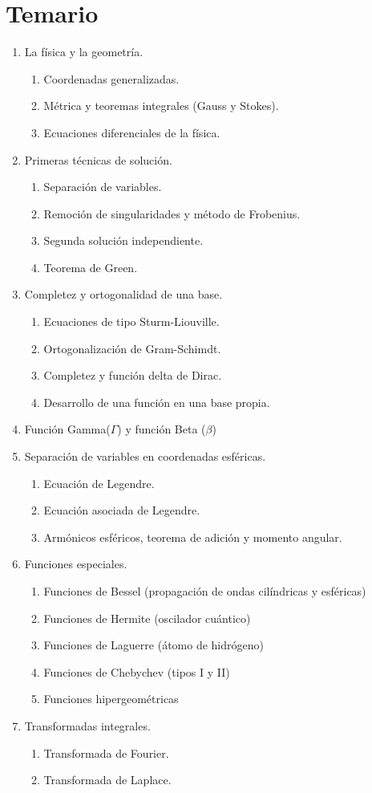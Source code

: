 \documentclass[12pt]{article}
\begin{document}
\section{Temario}
\begin{enumerate}
\item La física y la geometría.
\begin{enumerate}
\item Coordenadas generalizadas.
\item Métrica y teoremas integrales (Gauss y Stokes).
\item Ecuaciones diferenciales de la física.
\end{enumerate}
\item Primeras técnicas de solución.
\begin{enumerate}
\item Separación de variables.
\item Remoción de singularidades y método de Frobenius.
\item Segunda solución independiente.
\item Teorema de Green.
\end{enumerate}
\item Completez y ortogonalidad de una base.
\begin{enumerate}
\item Ecuaciones de tipo Sturm-Liouville.
\item Ortogonalización de Gram-Schimdt.
\item Completez y función delta de Dirac.
\item Desarrollo de una función en una base propia.
\end{enumerate}
\item Función Gamma($\Gamma$) y función Beta ($\beta$)
\item Separación de variables en coordenadas esféricas.
\begin{enumerate}
\item Ecuación de Legendre.
\item Ecuación asociada de Legendre.
\item Armónicos esféricos, teorema de adición y momento angular.
\end{enumerate}
\item Funciones especiales.
\begin{enumerate}
\item Funciones de Bessel (propagación de ondas cilíndricas y esféricas)
\item Funciones de Hermite (oscilador cuántico)
\item Funciones de Laguerre (átomo de hidrógeno)
\item Funciones de Chebychev (tipos I y II)
\item Funciones hipergeométricas
\end{enumerate}
\item Transformadas integrales.
\begin{enumerate}
\item Transformada de Fourier.
\item Transformada de Laplace.
\end{enumerate}
\end{enumerate}
\end{document}
